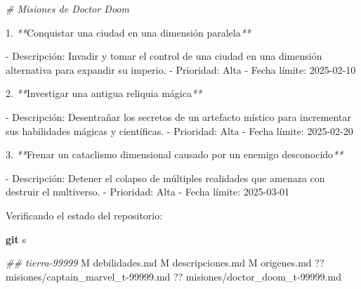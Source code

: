 \documentclass[
]{book}
\newenvironment{Shaded}{\begin{snugshade}}{\end{snugshade}}
\newcommand{\CommentTok}[1]{\textcolor[rgb]{0.56,0.35,0.01}{\textit{#1}}}
\newcommand{\ExtensionTok}[1]{#1}
\newcommand{\FunctionTok}[1]{\textcolor[rgb]{0.13,0.29,0.53}{\textbf{#1}}}
\newcommand{\NormalTok}[1]{#1}
\newcommand{\PreprocessorTok}[1]{\textcolor[rgb]{0.56,0.35,0.01}{\textit{#1}}}
\begin{document}
\begin{Shaded}
\begin{Highlighting}[]
\CommentTok{\# Misiones de Doctor Doom}

\ExtensionTok{1.} \PreprocessorTok{**}\NormalTok{Conquistar una ciudad en una dimensión paralela}\PreprocessorTok{**}
   
   \ExtensionTok{{-}}\NormalTok{ Descripción: Invadir y tomar el control de una ciudad en una dimensión alternativa para expandir su imperio.}
   \ExtensionTok{{-}}\NormalTok{ Prioridad: Alta}
   \ExtensionTok{{-}}\NormalTok{ Fecha límite: 2025{-}02{-}10}

\ExtensionTok{2.} \PreprocessorTok{**}\NormalTok{Investigar una antigua reliquia mágica}\PreprocessorTok{**}
   
   \ExtensionTok{{-}}\NormalTok{ Descripción: Desentrañar los secretos de un artefacto místico para incrementar sus habilidades mágicas y científicas.}
   \ExtensionTok{{-}}\NormalTok{ Prioridad: Alta}
   \ExtensionTok{{-}}\NormalTok{ Fecha límite: 2025{-}02{-}20}

\ExtensionTok{3.} \PreprocessorTok{**}\NormalTok{Frenar un cataclismo dimensional causado por un enemigo desconocido}\PreprocessorTok{**}
   
   \ExtensionTok{{-}}\NormalTok{ Descripción: Detener el colapso de múltiples realidades que amenaza con destruir el multiverso.}
   \ExtensionTok{{-}}\NormalTok{ Prioridad: Alta}
   \ExtensionTok{{-}}\NormalTok{ Fecha límite: 2025{-}03{-}01}
\end{Highlighting}
\end{Shaded}

Verificando el estado del repositorio:

\begin{Shaded}
\begin{Highlighting}[]
\FunctionTok{git}\NormalTok{ s}
\end{Highlighting}
\end{Shaded}

\begin{Shaded}
\begin{Highlighting}[]
\CommentTok{\#\# tierra{-}99999}
 \ExtensionTok{M}\NormalTok{ debilidades.md}
 \ExtensionTok{M}\NormalTok{ descripciones.md}
 \ExtensionTok{M}\NormalTok{ origenes.md}
\ExtensionTok{??}\NormalTok{ misiones/captain\_marvel\_t{-}99999.md}
\ExtensionTok{??}\NormalTok{ misiones/doctor\_doom\_t{-}99999.md}
\end{Highlighting}
\end{Shaded}
\end{document}
